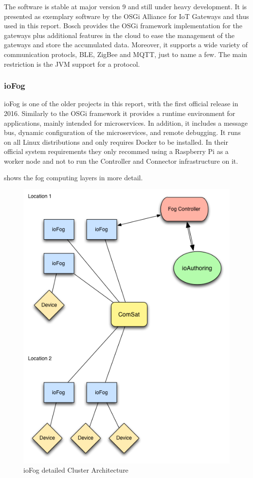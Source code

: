The software is stable at major version 9 and still under heavy development. It is presented as exemplary software by the OSGi Alliance for IoT Gateways \cite{exampleIoTGateweOSGi:online} and thus used in this report. Bosch provides the OSGi framework implementation for the gateways plus additional features in the cloud to ease the management of the gateways and store the accumulated data. Moreover, it supports a wide variety of communication protocls, BLE, ZigBee and MQTT, just to name a few. The main restriction is the JVM support for a protocol.  

\subsubsection{ioFog}
ioFog is one of the older projects in this report, with the first official release in 2016\cite{ioFogMainBlog:online}. Similarly to the OSGi framework it provides a runtime environment for applications, mainly intended for microservices. In addition, it includes a message bus, dynamic configuration of the microservices, and remote debugging\cite{ioFogMainBlog:online}. It runs on all Linux distributions and only requires Docker to be installed. In their official system requirements they only recommed using a Raspberry Pi as a worker node and not to run the Controller and Connector infrastructure on it\cite{ioFOgQuickStart:online}.

 shows the fog computing layers in more detail.
\begin{figure}[h!]
    \centering
    \includegraphics[scale=0.4]{figures/ioFog-Component_Diagram.png}
    \caption{ioFog detailed Cluster Architecture}
    \label{fig:ioFogComponent}
\end{figure}

